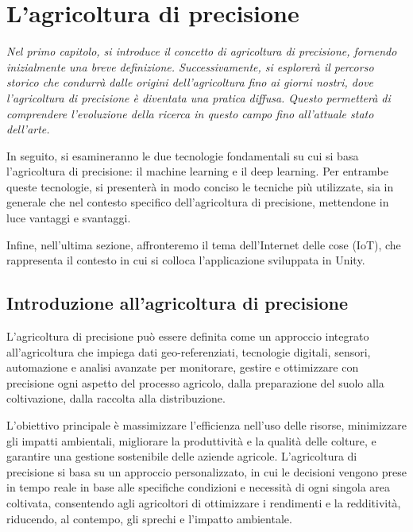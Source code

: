 \chapter{L'agricoltura di precisione}

\begin{preamble}
{\em Nel primo capitolo, si introduce il concetto di agricoltura di precisione, fornendo inizialmente una breve definizione. Successivamente, si esplorerà il percorso storico che condurrà dalle origini dell'agricoltura fino ai giorni nostri, dove l'agricoltura di precisione è diventata una pratica diffusa. Questo  permetterà di comprendere l'evoluzione della ricerca in questo campo fino all'attuale stato dell'arte.

In seguito, si esamineranno le due tecnologie fondamentali su cui si basa l'agricoltura di precisione: il machine learning e il deep learning. Per entrambe queste tecnologie, si presenterà in modo conciso le tecniche più utilizzate, sia in generale che nel contesto specifico dell'agricoltura di precisione, mettendone in luce vantaggi e svantaggi.

Infine, nell'ultima sezione, affronteremo il tema dell'Internet delle cose (IoT), che rappresenta il contesto in cui si colloca l'applicazione sviluppata in Unity.
}
\end{preamble}

\section{Introduzione all'agricoltura di precisione}

L'agricoltura di precisione può essere definita come un approccio integrato all'agricoltura che impiega dati geo-referenziati, tecnologie digitali, sensori, automazione e analisi avanzate per monitorare, gestire e ottimizzare con precisione ogni aspetto del processo agricolo, dalla preparazione del suolo alla coltivazione, dalla raccolta alla distribuzione. 

L'obiettivo principale è massimizzare l'efficienza nell'uso delle risorse, minimizzare gli impatti ambientali, migliorare la produttività e la qualità delle colture, e garantire una gestione sostenibile delle aziende agricole. L'agricoltura di precisione si basa su un approccio personalizzato, in cui le decisioni vengono prese in tempo reale in base alle specifiche condizioni e necessità di ogni singola area coltivata, consentendo agli agricoltori di ottimizzare i rendimenti e la redditività, riducendo, al contempo, gli sprechi e l'impatto ambientale.

